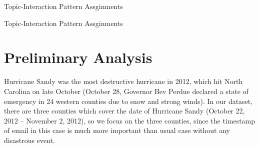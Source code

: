 \documentclass[a4paper]{article}
\begin{document}
\begin{algorithm}[H]
		\SetAlgoLined
	\caption{Topic-Interaction Pattern Assginments}
\end{algorithm}
\begin{algorithm}[H]
	\SetAlgoLined
	\caption{Topic-Interaction Pattern Assginments}
\end{algorithm}
\section{Preliminary Analysis}
Hurricane Sandy was the most destructive hurricane in 2012, which hit North Carolina on late October (October 28, Governor Bev Perdue declared a state of emergency in 24 western counties due to snow and strong winds). In our dataset, there are three counties which cover the date of Hurricane Sandy (October 22, 2012 – November 2, 2012), so we focus on the three counties, since the timestamp of email in this case is much more important than usual case without any disastrous event.
\end{document}
